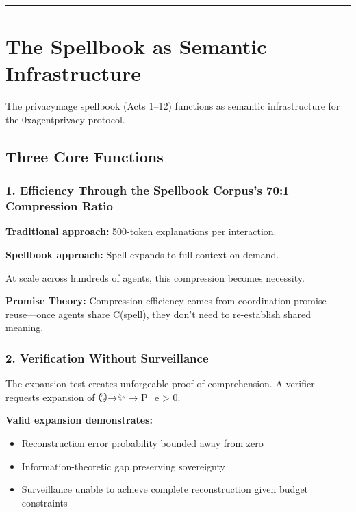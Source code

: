 \documentclass[
  11pt,
]{article}
\begin{document}
\begin{center}\rule{0.5\linewidth}{0.5pt}\end{center}

\section{The Spellbook as Semantic
Infrastructure}\label{the-spellbook-as-semantic-infrastructure}

The privacymage spellbook (Acts 1--12) functions as semantic
infrastructure for the 0xagentprivacy protocol.

\subsection{Three Core Functions}\label{three-core-functions}

\subsubsection{1. Efficiency Through the Spellbook Corpus's 70:1
Compression
Ratio}\label{efficiency-through-the-spellbook-corpuss-701-compression-ratio}

\textbf{Traditional approach:} 500-token explanations per interaction.

\textbf{Spellbook approach:} Spell expands to full context on demand.

At scale across hundreds of agents, this compression becomes necessity.

\textbf{Promise Theory:} Compression efficiency comes from coordination
promise reuse---once agents share C(spell), they don't need to
re-establish shared meaning.

\subsubsection{2. Verification Without
Surveillance}\label{verification-without-surveillance}

The expansion test creates unforgeable proof of comprehension. A
verifier requests expansion of 🪞→✨ → P\_e \textgreater{} 0.

\textbf{Valid expansion demonstrates:}

\begin{itemize}
\item
  Reconstruction error probability bounded away from zero
\item
  Information-theoretic gap preserving sovereignty
\item
  Surveillance unable to achieve complete reconstruction given budget
  constraints
\end{itemize}
\end{document}
